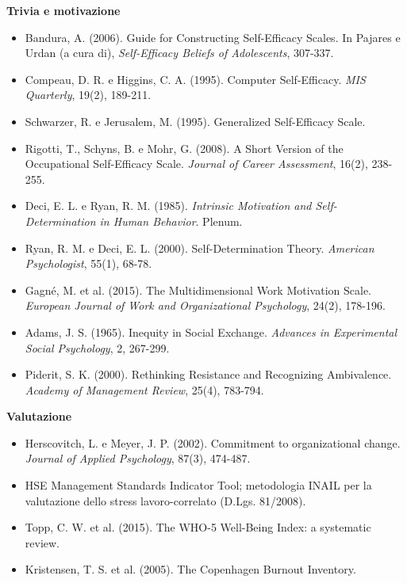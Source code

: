 \documentclass[11pt,a4paper]{article}
\begin{document}
\textbf{Trivia e motivazione}
\begin{itemize}
\item Bandura, A. (2006). Guide for Constructing Self-Efficacy Scales. In Pajares e Urdan (a cura di), \emph{Self-Efficacy Beliefs of Adolescents}, 307-337.
\item Compeau, D. R. e Higgins, C. A. (1995). Computer Self-Efficacy. \emph{MIS Quarterly}, 19(2), 189-211.
\item Schwarzer, R. e Jerusalem, M. (1995). Generalized Self-Efficacy Scale.
\item Rigotti, T., Schyns, B. e Mohr, G. (2008). A Short Version of the Occupational Self-Efficacy Scale. \emph{Journal of Career Assessment}, 16(2), 238-255.
\item Deci, E. L. e Ryan, R. M. (1985). \emph{Intrinsic Motivation and Self-Determination in Human Behavior}. Plenum.
\item Ryan, R. M. e Deci, E. L. (2000). Self-Determination Theory. \emph{American Psychologist}, 55(1), 68-78.
\item Gagné, M. et al. (2015). The Multidimensional Work Motivation Scale. \emph{European Journal of Work and Organizational Psychology}, 24(2), 178-196.
\item Adams, J. S. (1965). Inequity in Social Exchange. \emph{Advances in Experimental Social Psychology}, 2, 267-299.
\item Piderit, S. K. (2000). Rethinking Resistance and Recognizing Ambivalence. \emph{Academy of Management Review}, 25(4), 783-794.
\end{itemize}

\textbf{Valutazione}
\begin{itemize}
\item Herscovitch, L. e Meyer, J. P. (2002). Commitment to organizational change. \emph{Journal of Applied Psychology}, 87(3), 474-487.
\item HSE Management Standards Indicator Tool; metodologia INAIL per la valutazione dello stress lavoro-correlato (D.Lgs. 81/2008).
\item Topp, C. W. et al. (2015). The WHO-5 Well-Being Index: a systematic review.
\item Kristensen, T. S. et al. (2005). The Copenhagen Burnout Inventory.
\end{itemize}
\end{document}
